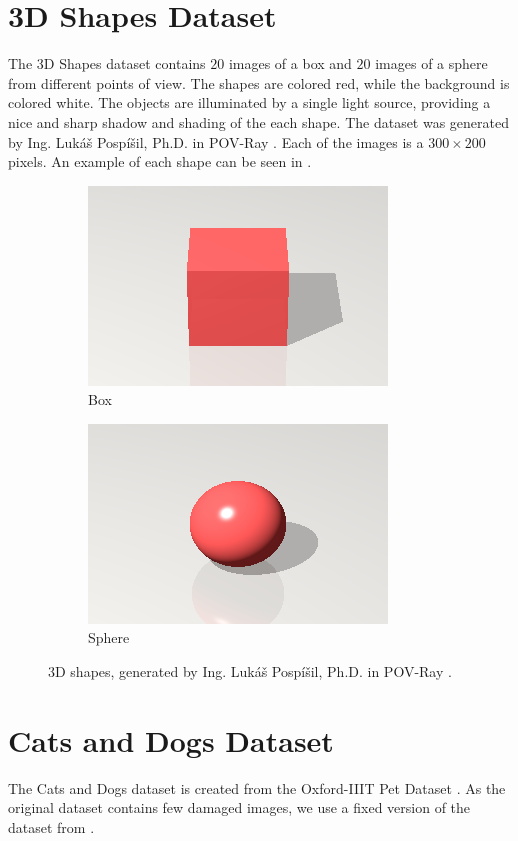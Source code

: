 \section{3D Shapes Dataset}
The 3D Shapes dataset contains $20$ images of a box and $20$ images of a sphere from different points of view. The shapes are colored red, while the background is colored white. The objects are illuminated by a single light source, providing a nice and sharp shadow and shading of the each shape. The dataset was generated by Ing. Lukáš Pospíšil, Ph.D. in POV-Ray \cite{povray}. Each of the images is a $300\times200$ pixels. An example of each shape can be seen in .
\begin{figure}[ht]
    \centering
    \begin{subfigure}[t]{0.2\textwidth}
        \includegraphics[width=\textwidth]{Figures/datasets/box.png}
        \caption{Box}
    \end{subfigure}
    \begin{subfigure}[t]{0.2\textwidth}
        \includegraphics[width=\textwidth]{Figures/datasets/sphere.png}
        \caption{Sphere}
    \end{subfigure}
    \caption[3D shapes, generated by Ing. Lukáš Pospíšil, Ph.D. in POV-Ray]{3D shapes, generated by Ing. Lukáš Pospíšil, Ph.D. in POV-Ray \cite{povray}.}
    \label{fig:3d_shapes}
\end{figure}

\section{Cats and Dogs Dataset}
The Cats and Dogs dataset is created from the Oxford-IIIT Pet Dataset \cite{parkhi12a}. As the original dataset contains few damaged images, we use a fixed version of the dataset from \cite{ml4py_dataset}.
